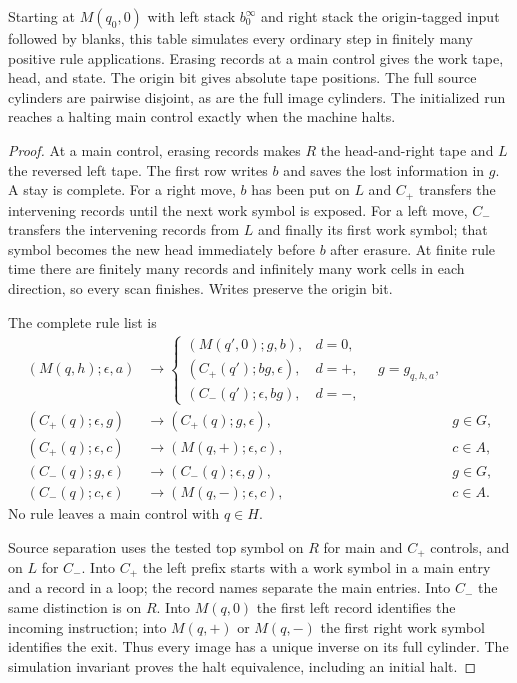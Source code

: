 \begin{lemma}\label{lem:sa-interleaved}
Starting at $M(q_0,0)$ with left stack $b_0^\infty$ and right stack the
origin-tagged input followed by blanks, this table simulates every ordinary
step in finitely many positive rule applications.  Erasing records at a
main control gives the work tape, head, and state.  The origin bit gives
absolute tape positions.  The full source cylinders are pairwise disjoint,
as are the full image cylinders.  The initialized run reaches a halting
main control exactly when the machine halts.
\end{lemma}
\begin{proof}
At a main control, erasing records makes $R$ the head-and-right tape and
$L$ the reversed left tape.  The first row writes $b$ and saves the lost
information in $g$.  A stay is complete.  For a right move, $b$ has been
put on $L$ and $C_+$ transfers the intervening records until the next
work symbol is exposed.  For a left move, $C_-$ transfers the intervening
records from $L$ and finally its first work symbol; that symbol becomes
the new head immediately before $b$ after erasure.  At finite rule time
there are finitely many records and infinitely many work cells in each
direction, so every scan finishes.  Writes preserve the origin bit.

The complete rule list is
\begin{equation}\label{eq:sa-interleaved-table}
\begin{aligned}
 (M(q,h);\epsilon,a)&\to
 \begin{cases}
 (M(q',0);g,b),&d=0,\\
 (C_+(q');bg,\epsilon),&d=+,\\
 (C_-(q');\epsilon,bg),&d=-,
 \end{cases}\quad g=g_{q,h,a},\\
 (C_+(q);\epsilon,g)&\to(C_+(q);g,\epsilon),&g\in G,\\
 (C_+(q);\epsilon,c)&\to(M(q,+);\epsilon,c),&c\in A,\\
 (C_-(q);g,\epsilon)&\to(C_-(q);\epsilon,g),&g\in G,\\
 (C_-(q);c,\epsilon)&\to(M(q,-);\epsilon,c),&c\in A.
\end{aligned}
\end{equation}
No rule leaves a main control with $q\in H$.

Source separation uses the tested top symbol on $R$ for main and $C_+$
controls, and on $L$ for $C_-$.  Into $C_+$ the left prefix starts with a
work symbol in a main entry and a record in a loop; the record names
separate the main entries.  Into $C_-$ the same distinction is on $R$.
Into $M(q,0)$ the first left record identifies the incoming instruction;
into $M(q,+)$ or $M(q,-)$ the first right work symbol identifies the exit.
Thus every image has a unique inverse on its full cylinder.  The simulation
invariant proves the halt equivalence, including an initial halt.
\end{proof}

